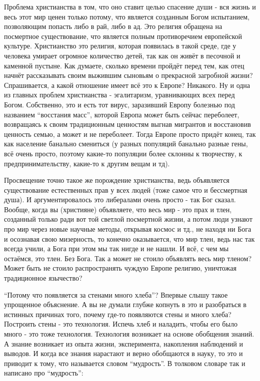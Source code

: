 \begin{multicols}{2}
\begin{itemize}
Проблема христианства в том, что оно ставит целью спасение души - вся жизнь и
весь этот мир ценен только потому, что является созданным Богом испытанием,
позволяющим попасть либо в рай, либо в ад. Это религия обращена на посмертное
существование, что является полным противоречием европейской культуре.
Христианство это религия, которая появилась в такой среде, где у человека
умирает огромное количество детей, так как он живёт в песочной и каменной
пустыне. Как думаете, сколько времени пройдёт перед тем, как отец начнёт
рассказывать своим выжившим сыновьям о прекрасной загробной жизни?
Спрашивается, а какой отношение имеет всё это к Европе? Никакого. Ну и одна из
главных проблем христианства - эгалитаризм, уравнивающих всех перед Богом.
Собственно, это и есть тот вирус, заразивший Европу болезнью под названием
\enquote{восстания масс}, которой Европа может быть сейчас переболеет, возвращаясь к
своим традиционным ценностям выгнав мигрантов и восстановив ценность семью, а
может и не переболеет. Тогда Европе просто придёт конец, так как население
банально смениться (у разных популяций банально разные гены, всё очень просто,
поэтому какие-то популяции более склонны к творчеству, к предпринимательству,
какие-то к другим вещам и тд). 

Просвещение точно такое же порождение христианства, ведь объявляется
существование естественных прав у всех людей (тоже самое что и бессмертная
душа). И аргументировалось это либералами очень просто - так Бог сказал.
Вообще, когда вы (християне) объявляете, что весь мир - это прах и тлен,
созданный только ради вот той светлой посмертной жизни, а потом люди узнают про
мир через новые научные методы, открывая космос и тд., не находя ни Бога и
осознавая свою мизерность, то конечно оказывается, что мир тлен, ведь нас так
всегда учили, а Бога при этом мы так нигде и не нашли. И всё, с чем мы
остаёмся, это тлен. Без Бога. Так а может не стоило объявлять весь мир тленом?
Может быть не стоило распространять чуждую Европе религию, уничтожая
традиционное язычество?


\enquote{Потому что появляется за стенами много хлеба}? Впервые слышу такое упрощенное
объяснение. А вы не думали глубже копнуть в это и разобраться в истинных
причинах того, почему где-то появляются стены и много хлеба? Построить стены -
это технология. Испечь хлеб и наладить, чтобы его было много - это тоже
технология. Технология возникает на основе обобщения знаний. А знание возникает
из опыта жизни, эксперимента, накопления наблюдений и выводов. И когда все
знания нарастают и верно обобщаются в науку, то это и приводит к тому, что
называется словом \enquote{мудрость}. В толковом словаре так и написано про \enquote{мудрость}:


\end{itemize}
\end{multicols}

